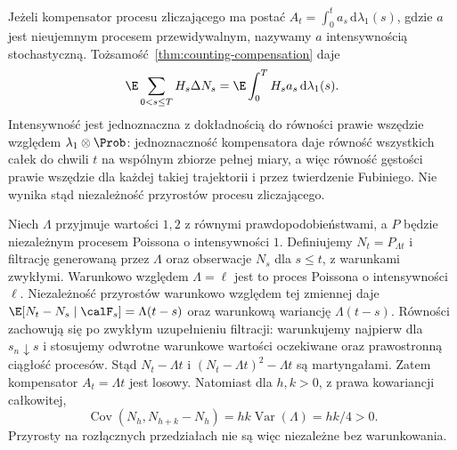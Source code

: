 \begin{uwaga}
\label{rem:stochastic-counting-intensity}
Jeżeli kompensator procesu zliczającego ma postać
$A_t=\int_0^t a_s\,\mathrm d\lambda_1(s)$,
gdzie $a$ jest nieujemnym procesem przewidywalnym,
nazywamy $a$ intensywnością stochastyczną.
Tożsamość~\ref{thm:counting-compensation} daje
\[
\E\sum_{0<s\le T}H_s\Delta N_s
=\E\int_0^T H_s a_s\,\mathrm d\lambda_1(s).
\]
Intensywność jest jednoznaczna z dokładnością
do równości prawie wszędzie względem
$\lambda_1\otimes\Prob$: jednoznaczność
kompensatora daje równość wszystkich całek
do chwili $t$ na wspólnym zbiorze pełnej miary,
a więc równość gęstości prawie wszędzie
dla każdej takiej trajektorii i przez twierdzenie
Fubiniego. Nie wynika stąd niezależność
przyrostów procesu zliczającego.
\end{uwaga}

\begin{przyklad}
\label{ex:random-rate-counting}
Niech $\Lambda$ przyjmuje wartości $1,2$ z równymi
prawdopodobieństwami, a $P$ będzie niezależnym
procesem Poissona o intensywności $1$.
Definiujemy $N_t=P_{\Lambda t}$ i filtrację
generowaną przez $\Lambda$ oraz obserwacje
$N_s$ dla $s\le t$, z warunkami zwykłymi.
Warunkowo względem $\Lambda=\ell$ jest to
proces Poissona o intensywności $\ell$.
Niezależność przyrostów warunkowo względem
tej zmiennej daje
$\E[N_t-N_s\mid\calF_s]=\Lambda(t-s)$
oraz warunkową wariancję $\Lambda(t-s)$.
Równości zachowują się po zwykłym uzupełnieniu
filtracji: warunkujemy najpierw dla
$s_n\downarrow s$ i stosujemy odwrotne
warunkowe wartości oczekiwane oraz
prawostronną ciągłość procesów.
Stąd $N_t-\Lambda t$ i
$(N_t-\Lambda t)^2-\Lambda t$ są martyngałami.
Zatem kompensator $A_t=\Lambda t$ jest losowy.
Natomiast dla $h,k>0$, z prawa kowariancji
całkowitej,
\[
\operatorname{Cov}(N_h,N_{h+k}-N_h)
=hk\operatorname{Var}(\Lambda)=hk/4>0.
\]
Przyrosty na rozłącznych przedziałach
nie są więc niezależne bez warunkowania.
\end{przyklad}

